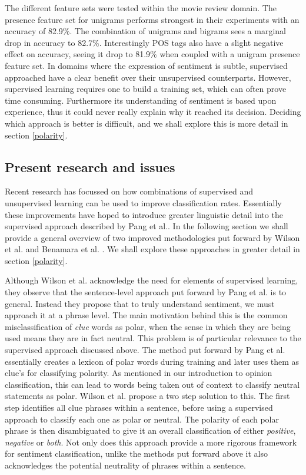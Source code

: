 The different feature sets were tested within the movie review domain. The presence feature set for unigrams performs strongest in their experiments with an accuracy of 82.9\%. The combination of unigrams and bigrams sees a marginal drop in accuracy to 82.7\%. Interestingly POS tags also have a slight negative effect on accuracy, seeing it drop to 81.9\% when coupled with a unigram presence feature set. In domains where the expression of sentiment is subtle, supervised approached have a clear benefit over their unsupervised counterparts. However, supervised learning requires one to build a training set, which can often prove time consuming. Furthermore its understanding of sentiment is based upon experience, thus it could never really explain why it reached its decision. Deciding which approach is better is difficult, and we shall explore this is more detail in section \ref{polarity}.

\subsection{Present research and issues}

Recent research has focussed on how combinations of supervised and unsupervised learning can be used to improve classification rates. Essentially these improvements have hoped to introduce greater linguistic detail into the supervised approach described by Pang et al.. In the following section we shall provide a general overview of two improved methodologies put forward by Wilson et al. \cite{Wilson:2005tt} and Benamara et al. \cite{Benamara:2007wz}.  We shall explore these approaches in greater detail in section \ref{polarity}.

Although Wilson et al. \cite{Wilson:2005tt} acknowledge the need for elements of supervised learning, they observe that the sentence-level approach put forward by Pang et al. is to general. Instead they propose that to truly understand sentiment, we must approach it at a phrase level. The main motivation behind this is the common misclassification of \emph{clue} words as polar, when the sense in which they are being used means they are in fact neutral. This problem is of particular relevance to the supervised approach discussed above. The method put forward by Pang et al. essentially creates a lexicon of polar words during training and later uses them as clue's for classifying polarity. As mentioned in our introduction to opinion classification, this can lead to words being taken out of context to classify neutral statements as polar. Wilson et al. propose a two step solution to this. The first step identifies all clue phrases within a sentence, before using a supervised approach to classify each one as polar or neutral. The polarity of each polar phrase is then disambiguated to give it an overall classification of either \emph{positive}, \emph{negative} or \emph{both}. Not only does this approach provide a more rigorous framework for sentiment classification, unlike the methods put forward above it also acknowledges the potential neutrality of phrases within a sentence.

